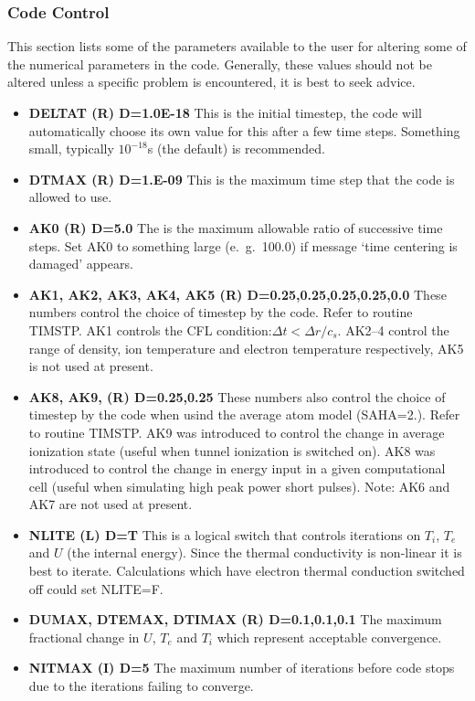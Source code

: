 \subsubsection{\bf Code Control}
\newline
This section lists some of the parameters available to the user for
altering some of the numerical parameters in the code. Generally,
these values should not be altered unless a specific problem
is encountered, it is best to seek advice.
\begin{itemize}
\item {\bf DELTAT (R) D=1.0E-18}
This is the initial timestep, the code will automatically choose
its own value for this after a few time steps. Something small, typically
$10^{-18}$s (the default) is recommended.
\item {\bf DTMAX (R) D=1.E-09}
This is the maximum time step that the code is allowed to use.
\item {\bf AK0 (R) D=5.0}
The is the maximum allowable ratio of successive time steps. Set AK0
to something large (e.\ g.\ 100.0) if message `time centering is damaged'
appears.
\item {\bf AK1, AK2, AK3, AK4, AK5 (R) D=0.25,0.25,0.25,0.25,0.0}
These numbers control the choice of timestep by the code. Refer to routine
TIMSTP. AK1 controls the CFL condition:$\Delta t<\Delta r/c_s$.
AK2--4 control the range of density,
ion temperature and electron temperature
respectively, AK5 is not used at present.

\item {\bf AK8, AK9,  (R) D=0.25,0.25}
These numbers also control the choice of timestep by the code when usind the average atom model (SAHA=2.). 
Refer to routine
TIMSTP. AK9 was introduced to control the change in average ionization state
(useful when tunnel ionization is switched on). AK8 was introduced to control the change in 
energy input in a given computational cell 
(useful when simulating high peak power short pulses).  
Note: AK6 and AK7 are not used at present.

\item {\bf NLITE (L) D=T}
This is a logical switch that controls iterations on $T_i$, $T_e$ and $U$
(the internal energy). Since the thermal conductivity is non-linear
it is best to iterate. Calculations which have electron thermal conduction
switched off could set NLITE=F.
\item {\bf DUMAX, DTEMAX, DTIMAX (R) D=0.1,0.1,0.1}
The maximum fractional change in $U$, $T_e$ and $T_i$ which represent
acceptable convergence.
\item {\bf NITMAX (I) D=5}
The maximum number of iterations before code stops due to the iterations
failing to converge.
\end{itemize}


